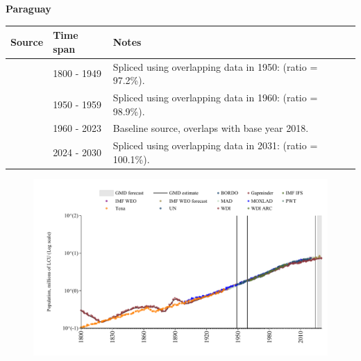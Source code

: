 \documentclass[12pt,a4paper,landscape]{article}
\begin{document}
\begin{adjustbox}{max totalsize={\paperwidth}{\paperheight},center}
\begin{minipage}[t][\textheight][t]{\textwidth}
\vspace*{0.5cm}
{}
\begin{center}
{\Large\bfseries Paraguay}
\end{center}
\vspace{0.5cm}
\begin{table}[H]
\centering
\small
\begin{tabular}{|l|l|l|}
\hline
\textbf{Source} & \textbf{Time span} & \textbf{Notes} \\
\hline
\rowcolor{white}\cite{Gapminder}& 1800 - 1949 &Spliced using overlapping data in 1950: (ratio = 97.2\%).\\
\rowcolor{lightgray}\cite{IMF_IFS}& 1950 - 1959 &Spliced using overlapping data in 1960: (ratio = 98.9\%).\\
\rowcolor{white}\cite{WDI}& 1960 - 2023 &Baseline source, overlaps with base year 2018.\\
\rowcolor{lightgray}\cite{Gapminder}& 2024 - 2030 &Spliced using overlapping data in 2031: (ratio = 100.1\%).\\
\hline
\end{tabular}
\end{table}
\begin{figure}[H]
\centering
\includegraphics[width=\textwidth,height=0.6\textheight,keepaspectratio]{graphs/PRY_pop.pdf}
\end{figure}
\end{minipage}
\end{adjustbox}
\end{document}
